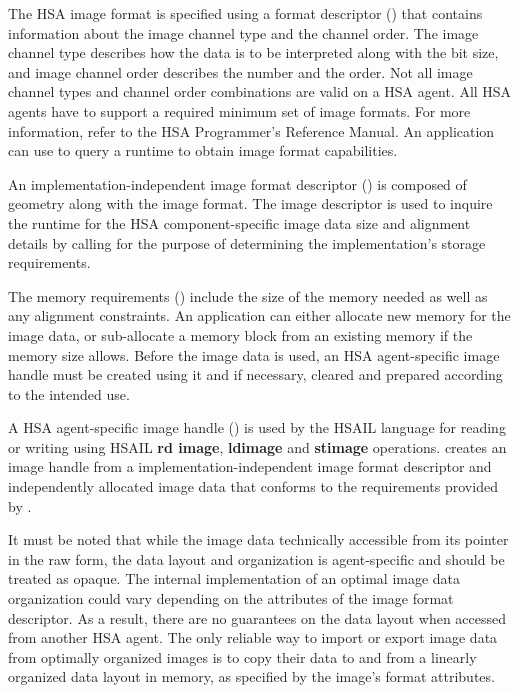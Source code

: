 \documentclass[final]{book}
\newcommand{\reffun}[1]{\textbf{#1}}
\newcommand{\refhsl}[1]{\reffun{#1}}
\begin{document}
The HSA image format is specified using a format descriptor
() that contains information about the image
channel type and the channel order. The image channel type describes how the
data is to be interpreted along with the bit size, and image channel order
describes the number and the order. Not all image channel types and channel
order combinations are valid on a HSA agent. All HSA agents have to support a
required minimum set of image formats. For more information, refer to the HSA
Programmer's Reference Manual\cite{prm}. An application can use
 to query a runtime
to obtain image format capabilities.

An implementation-independent image format descriptor
() is composed of geometry along with the
image format. The image descriptor is used to inquire the runtime for the HSA
component-specific image data size and alignment details by calling
 for the purpose of determining the
implementation's storage requirements.

The memory requirements () include the size of the
memory needed as well as any alignment constraints. An application can either
allocate new memory for the image data, or sub-allocate a memory block from an
existing memory if the memory size allows. Before the image data is used, an HSA
agent-specific image handle must be created using it and if necessary, cleared
and prepared according to the intended use.

A HSA agent-specific image handle () is used by
the HSAIL language for reading or writing using HSAIL \refhsl{rd image},
\refhsl{ldimage} and \refhsl{stimage}
operations.  creates an image handle from a
implementation-independent image format descriptor and independently allocated
image data that conforms to the requirements provided by
.

It must be noted that while the image data technically accessible from its
pointer in the raw form, the data layout and organization is agent-specific and
should be treated as opaque. The internal implementation of an optimal image
data organization could vary depending on the attributes of the image format
descriptor. As a result, there are no guarantees on the data layout when
accessed from another HSA agent. The only reliable way to import or export image
data from optimally organized images is to copy their data to and from a
linearly organized data layout in memory, as specified by the image's format
attributes.
\end{document}
